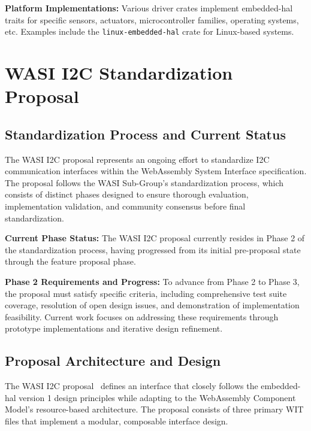 \textbf{Platform Implementations:} Various driver crates implement embedded-hal traits for specific sensors, actuators, microcontroller families, operating systems, etc. Examples include the \texttt{linux-embedded-hal} crate for Linux-based systems.

\section{WASI I2C Standardization Proposal}
\label{sec:wasi-i2c-proposal}

\subsection{Standardization Process and Current Status}
\label{subsec:i2c-standardization-process}

The WASI I2C proposal represents an ongoing effort to standardize I2C communication interfaces within the WebAssembly System Interface specification\cite{wasi_i2c_proposal}. The proposal follows the WASI Sub-Group's standardization process, which consists of distinct phases designed to ensure thorough evaluation, implementation validation, and community consensus before final standardization.

\textbf{Current Phase Status:} The WASI I2C proposal currently resides in Phase 2 of the standardization process, having progressed from its initial pre-proposal state through the feature proposal phase.

\textbf{Phase 2 Requirements and Progress:} To advance from Phase 2 to Phase 3, the proposal must satisfy specific criteria, including comprehensive test suite coverage, resolution of open design issues, and demonstration of implementation feasibility. Current work focuses on addressing these requirements through prototype implementations and iterative design refinement.

\subsection{Proposal Architecture and Design}
\label{subsec:i2c-proposal-design}

The WASI I2C proposal~\cite{wasi_i2c_proposal} defines an interface that closely follows the embedded-hal version 1 design principles while adapting to the WebAssembly Component Model's resource-based architecture. The proposal consists of three primary WIT files that implement a modular, composable interface design.


